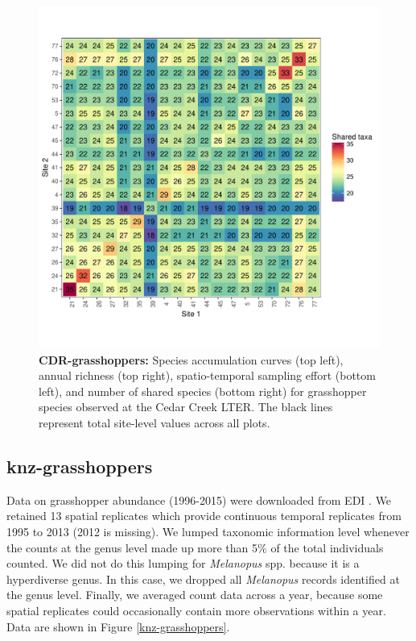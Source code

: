 \documentclass[11pt, oneside]{article}
\begin{document}
\begin{figure}[h!]
\includegraphics[scale = 0.4]{cdr-grasshopper-compagnoni_spp_shared.pdf}
\caption{{\bf CDR-grasshoppers:} Species accumulation curves (top left),  annual richness (top right), spatio-temporal sampling effort (bottom left), and number of shared species (bottom right) for grasshopper species observed at the Cedar Creek LTER. The black lines represent total site-level values across all plots.}
\label{cdr-grasshoppers}
\end{figure}



\subsection{knz-grasshoppers}
Data on grasshopper abundance (1996-2015) were downloaded from  EDI \citep{knz-grasshoppers}.
We retained 13 spatial replicates which provide continuous temporal replicates from 1995 to 2013 (2012 is missing). 
We lumped taxonomic information level whenever the counts at the genus level made up more than 5$\%$ of the total individuals counted. 
We did not do this lumping for {\it Melanopus} spp. because it is a hyperdiverse genus. 
In this case, we dropped all {\it Melanopus} records identified at the genus level. 
Finally, we averaged count data across a year, because some spatial replicates could occasionally contain more observations within a year.
Data are shown in Figure \ref{knz-grasshoppers}.
\end{document}
